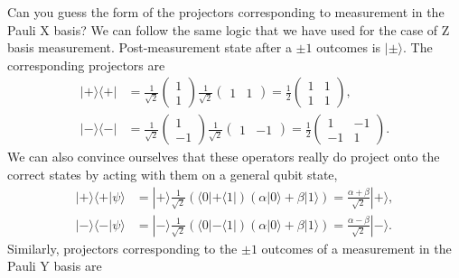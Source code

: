 Can you guess the form of the projectors corresponding to measurement in the Pauli X basis?
We can follow the same logic that we have used for the case of Z basis measurement.
Post-measurement state after a $\pm1$ outcomes is $|\pm\rangle$.
The corresponding projectors are
\begin{align}
    |+\rangle\langle+| & = \frac{1}{\sqrt{2}} \begin{pmatrix} 1 \\ 1 \end{pmatrix} \frac{1}{\sqrt{2}} \begin{pmatrix} 1 & 1 \end{pmatrix} = \frac{1}{2} \begin{pmatrix} 1 & 1 \\ 1 & 1 \end{pmatrix}, \\
    |-\rangle\langle-| & = \frac{1}{\sqrt{2}} \begin{pmatrix} 1 \\ -1 \end{pmatrix} \frac{1}{\sqrt{2}} \begin{pmatrix} 1 & -1 \end{pmatrix} = \frac{1}{2} \begin{pmatrix} 1 & -1 \\ -1 & 1 \end{pmatrix}.
\end{align}
We can also convince ourselves that these operators really do project onto the correct states by acting with them on a general qubit state,
\begin{align}
    |+\rangle\langle+|\psi\rangle & = |+\rangle \frac{1}{\sqrt{2}} \left( \langle0| + \langle1| \right) \left( \alpha |0\rangle + \beta|1\rangle \right) = \frac{\alpha+\beta}{\sqrt{2}} |+\rangle, \\
    |-\rangle\langle-|\psi\rangle & = |-\rangle \frac{1}{\sqrt{2}} \left( \langle0| - \langle1| \right) \left( \alpha |0\rangle + \beta|1\rangle \right) = \frac{\alpha-\beta}{\sqrt{2}} |-\rangle.
\end{align}
Similarly, projectors corresponding to the $\pm1$ outcomes of a measurement in the Pauli Y basis are
